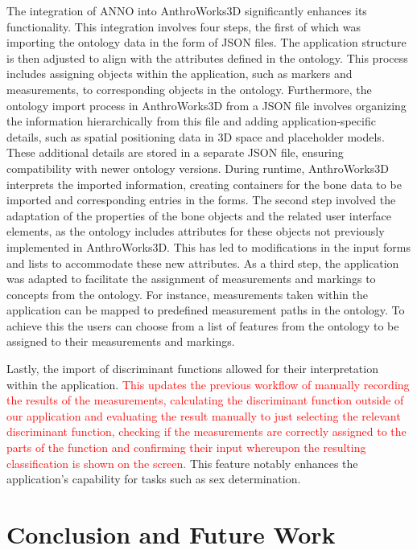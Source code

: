 \documentclass[sw]{iosart2x}
\newcommand{\aw}{AnthroWorks3D}
\newcommand{\revision}[1]{\textcolor{red}{#1}}%
\begin{document}
The integration of ANNO into \aw{} significantly enhances its functionality.
This integration involves four steps, the first of which was importing the ontology data in the form of JSON files.
The application structure is then adjusted to align with the attributes defined in the ontology.
This process includes assigning objects within the application, such as markers and measurements, to corresponding objects in the ontology.
Furthermore, the ontology import process in \aw{} from a JSON file involves organizing the information hierarchically from this file and adding application-specific details, such as spatial positioning data in 3D space and placeholder models.
These additional details are stored in a separate JSON file, ensuring compatibility with newer ontology versions.
During runtime, \aw{} interprets the imported information, creating containers for the bone data to be imported and corresponding entries in the forms.
The second step involved the adaptation of the properties of the bone objects and the related user interface elements, as the ontology includes attributes for these objects not previously implemented in \aw{}.
This has led to modifications in the input forms and lists to accommodate these new attributes.
As a third step, the application was adapted to facilitate the assignment of measurements and markings to concepts from the ontology.
For instance, measurements taken within the application can be mapped to predefined measurement paths in the ontology.
To achieve this the users can choose from a list of features from the ontology to be assigned to their measurements and markings.

Lastly, the import of discriminant functions allowed for their interpretation within the application.
\revision{%
This updates the previous workflow of manually recording the results of the measurements, calculating the discriminant function outside of our application and evaluating the result manually to just selecting the relevant discriminant function, checking if the measurements are correctly assigned to the parts of the function and confirming their input whereupon the resulting classification is shown on the screen.
}
This feature notably enhances the application's capability for tasks such as sex determination.

\section{Conclusion and Future Work}
\end{document}
